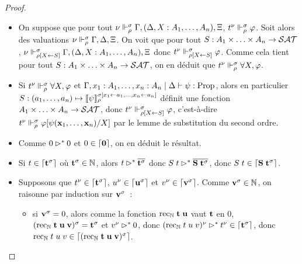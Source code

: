 \documentclass{article}
\begin{document}
\begin{proof}
\begin{itemize}
  \item On suppose que pour tout $\nu\Vdash_\rho^\sigma \Gamma, (\Delta, X : A_1,\ldots,A_n), \Xi$, $t^\nu \Vdash_\rho^\sigma \varphi$. Soit alors des valuations $\nu\Vdash_\rho^\sigma\Gamma, \Delta,\Xi$. On voit que pour tout $S : A_1\times\ldots\times A_n \to \mathcal {SAT}$, $\nu\Vdash_{\rho[X\leftarrow S]}^\sigma \Gamma, (\Delta, X : A_1,\ldots,A_n),\Xi$ donc $t^\nu\Vdash_{\rho[X\leftarrow S]}^\sigma \varphi$. Comme cela tient pour tout $S : A_1\times\ldots\times A_n \to \mathcal {SAT}$, on en déduit que $t^\nu\Vdash_\rho^\sigma \forall X, \varphi$. 
  \item Si $t^\nu\Vdash_\rho^\sigma \forall X, \varphi$ et $\Gamma,x_1 : A_1,\ldots,x_n : A_n\mid\Delta\vdash \psi : \mathrm{Prop}$, alors en particulier $S : (a_1,\ldots,a_n) \mapsto \llbracket \psi \rrbracket_\rho^{\sigma[x_1\leftarrow a_1,\ldots, x_n \leftarrow a_n]}$ définit une fonction $A_1\times\ldots\times A_n \to\mathcal {SAT}$, donc $t^\nu\Vdash_{\rho[X\leftarrow S]}^\sigma \varphi$, c'est-à-dire $t^\nu\Vdash_\rho^\sigma \varphi[\psi(\mathbf{x}_1,\ldots,\mathbf{x}_n)/X]$ par le lemme de substitution du second ordre.
  \item Comme $0\rhd^* 0$ et $0\in\lceil \boldsymbol 0 \rceil$, on en déduit le résultat.
  \item Si $t\in\lceil \mathbf{t}^\sigma \rceil$ où $\mathbf{t}^\sigma \in \mathbb{N}$, alors $t\rhd^* \overline{\mathbf{t}^\sigma}$ donc $S\;t\rhd^*\overline{\mathbf{S}\;\mathbf{t}^\sigma}$, donc $S\;t\in\lceil \mathbf{S}\;\mathbf{t}^\sigma \rceil$.
  \item Supposons que $t^\nu\in\lceil \mathbf{t}^\sigma \rceil$, $u^\nu\in\lceil \mathbf{u}^\sigma \rceil$ et $v^\nu\in\lceil \mathbf{v}^\sigma \rceil$. Comme $\mathbf{v}^\sigma\in\mathbb{N}$, on raisonne par induction sur $\mathbf{v}^\sigma$~:
    \begin{itemize}
    \item si $\mathbf{v}^\sigma = 0$, alors comme la fonction $\mathrm{rec}_{\mathbb{N}}\;\mathbf{t}\;\mathbf{u}$ vaut $\mathbf{t}$ en $0$, $(\mathrm{rec}_{\mathbb{N}}\;\mathbf{t}\;\mathbf{u}\;\mathbf{v})^\sigma = \mathbf{t}^\sigma$ et $v^\nu \rhd^* 0$, donc  $(\mathrm{rec}_{\mathbb{N}}\;t\;u\;v)^\nu \rhd^* t^\nu \in \lceil \mathbf{t}^\sigma \rceil$, donc $\mathrm{rec}_{\mathbb{N}}\;t\;u\;v \in \lceil (\mathrm{rec}_{\mathbb{N}}\;\mathbf{t}\;\mathbf{u}\;\mathbf{v})^\sigma \rceil$. 

\end{itemize}
\end{itemize}
\end{proof}
\end{document}
